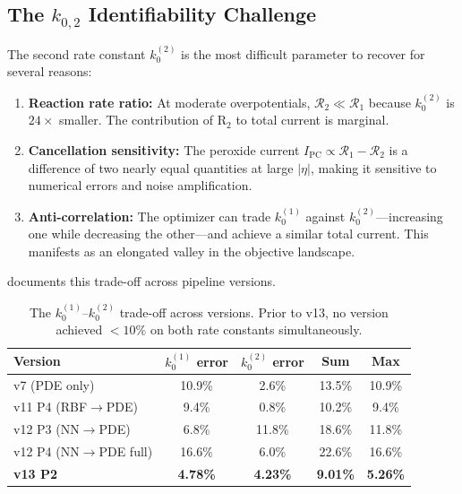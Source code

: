 \documentclass[11pt,a4paper]{article}
\newcommand{\kzero}{k_0}
\begin{document}
\subsection{The \texorpdfstring{$k_{0,2}$}{k0,2} Identifiability Challenge}\label{sec:identifiability}

The second rate constant $\kzero^{(2)}$ is the most difficult parameter
to recover for several reasons:

\begin{enumerate}
  \item \textbf{Reaction rate ratio:} At moderate overpotentials,
    $\mathcal{R}_2 \ll \mathcal{R}_1$ because $\kzero^{(2)}$ is $24\times$
    smaller. The contribution of R$_2$ to total current is marginal.
  \item \textbf{Cancellation sensitivity:} The peroxide current
    $I_{\mathrm{PC}} \propto \mathcal{R}_1 - \mathcal{R}_2$ is a
    difference of two nearly equal quantities at large $|\eta|$, making
    it sensitive to numerical errors and noise amplification.
  \item \textbf{Anti-correlation:} The optimizer can trade $\kzero^{(1)}$
    against $\kzero^{(2)}$---increasing one while decreasing the other---and
    achieve a similar total current. This manifests as an elongated valley
    in the objective landscape.
\end{enumerate}

 documents this trade-off across pipeline versions.

\begin{table}[H]
\centering
\caption{The $\kzero^{(1)}$--$\kzero^{(2)}$ trade-off across versions.
  Prior to v13, no version achieved $< 10\%$ on both rate constants simultaneously.}
\label{tab:tradeoff}
\begin{tabular}{lcccc}
\toprule
Version & $\kzero^{(1)}$ error & $\kzero^{(2)}$ error & Sum & Max \\
\midrule
v7 (PDE only) & 10.9\% & 2.6\% & 13.5\% & 10.9\% \\
v11 P4 (RBF$\to$PDE) & 9.4\% & 0.8\% & 10.2\% & 9.4\% \\
v12 P3 (NN$\to$PDE) & 6.8\% & 11.8\% & 18.6\% & 11.8\% \\
v12 P4 (NN$\to$PDE full) & 16.6\% & 6.0\% & 22.6\% & 16.6\% \\
\midrule
\textbf{v13 P2} & \textbf{4.78\%} & \textbf{4.23\%} & \textbf{9.01\%} & \textbf{5.26\%} \\
\bottomrule
\end{tabular}
\end{table}
\end{document}
